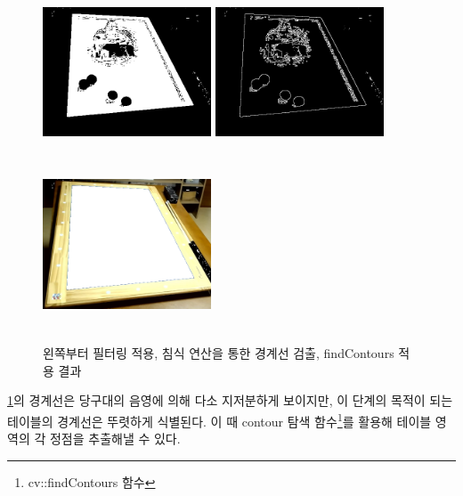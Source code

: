 \documentclass[11pt]{oblivoir}
\begin{document}
\begin{figure}[ht]
        \begin{center}
                \includegraphics[width=5cm, height=5cm, keepaspectratio]{img/billiards-table-filter.png}
                \includegraphics[width=5cm, height=5cm, keepaspectratio]{img/billiards-table-edge.png}
                \includegraphics[width=5cm, height=5cm, keepaspectratio]{img/billiards-table-contours.png}
        \end{center}
        \caption{왼쪽부터 필터링 적용, 침식 연산을 통한 경계선 검출, findContours 적용 결과}
        \label{fig;pool-table-edge}
\end{figure}


\cref{fig;pool-table-edge}의 경계선은 당구대의 음영에 의해 다소 지저분하게 보이지만, 이 단계의 목적이 되는 테이블의 경계선은 뚜렷하게 식별된다. 이 때 contour 탐색 함수\footnote{cv::findContours 함수}를 활용해 테이블 영역의 각 정점을 추출해낼 수 있다.
\end{document}
